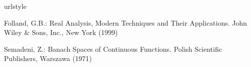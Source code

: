 
\begin{thebibliography}{1}
\providecommand{\url}[1]{{#1}}
\providecommand{\urlprefix}{URL }
\expandafter\ifx\csname urlstyle\endcsname\relax
  \providecommand{\doi}[1]{DOI~\discretionary{}{}{}#1}\else
  \providecommand{\doi}{DOI~\discretionary{}{}{}\begingroup
  \urlstyle{rm}\Url}\fi

Folland, G.B.: Real Analysis, Modern Techniques and Their Applications.
\newblock John Wiley \& Sons, Inc., New York (1999)

Semadeni, Z.: Banach Spaces of Continuous Functions.
\newblock Polish Scientific Publishers, Warszawa (1971)

\end{thebibliography}

